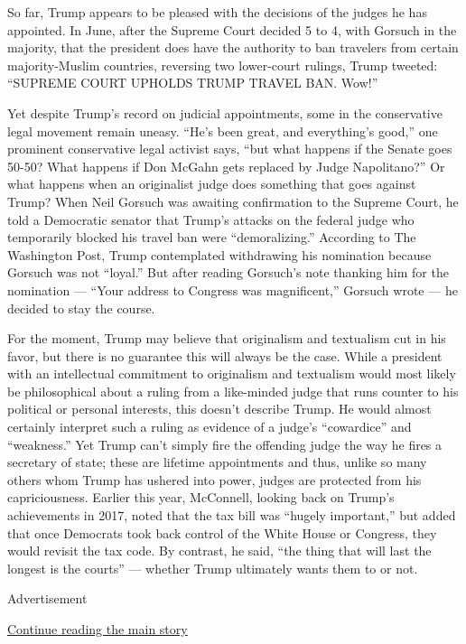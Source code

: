 So far, Trump appears to be pleased with the decisions of the judges he
has appointed. In June, after the Supreme Court decided 5 to 4, with
Gorsuch in the majority, that the president does have the authority to
ban travelers from certain majority-Muslim countries, reversing two
lower-court rulings, Trump tweeted: ``SUPREME COURT UPHOLDS TRUMP TRAVEL
BAN. Wow!''

Yet despite Trump's record on judicial appointments, some in the
conservative legal movement remain uneasy. ``He's been great, and
everything's good,'' one prominent conservative legal activist says,
``but what happens if the Senate goes 50-50? What happens if Don McGahn
gets replaced by Judge Napolitano?'' Or what happens when an originalist
judge does something that goes against Trump? When Neil Gorsuch was
awaiting confirmation to the Supreme Court, he told a Democratic senator
that Trump's attacks on the federal judge who temporarily blocked his
travel ban were ``demoralizing.'' According to The Washington Post,
Trump contemplated withdrawing his nomination because Gorsuch was not
``loyal.'' But after reading Gorsuch's note thanking him for the
nomination --- ``Your address to Congress was magnificent,'' Gorsuch
wrote --- he decided to stay the course.

For the moment, Trump may believe that originalism and textualism cut in
his favor, but there is no guarantee this will always be the case. While
a president with an intellectual commitment to originalism and
textualism would most likely be philosophical about a ruling from a
like-minded judge that runs counter to his political or personal
interests, this doesn't describe Trump. He would almost certainly
interpret such a ruling as evidence of a judge's ``cowardice'' and
``weakness.'' Yet Trump can't simply fire the offending judge the way he
fires a secretary of state; these are lifetime appointments and thus,
unlike so many others whom Trump has ushered into power, judges are
protected from his capriciousness. Earlier this year, McConnell, looking
back on Trump's achievements in 2017, noted that the tax bill was
``hugely important,'' but added that once Democrats took back control of
the White House or Congress, they would revisit the tax code. By
contrast, he said, ``the thing that will last the longest is the
courts'' --- whether Trump ultimately wants them to or not.

Advertisement

\protect\hyperlink{after-bottom}{Continue reading the main story}

